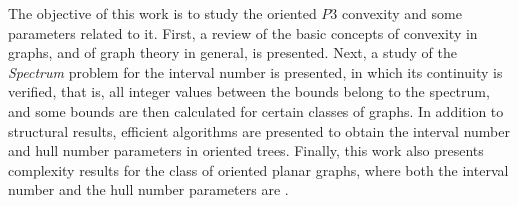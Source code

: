 The objective of this work is to study the oriented $P3$ convexity and some parameters related to it. First, a review of the basic concepts of convexity in graphs, and of graph theory in general, is presented. Next, a study of the \emph{Spectrum} problem for the interval number is presented, in which its continuity is verified, that is, all integer values between the bounds belong to the spectrum, and some bounds are then calculated for certain classes of graphs. In addition to structural results, efficient algorithms are presented to obtain the interval number and hull number parameters in oriented trees. Finally, this work also presents complexity results for the class of oriented planar graphs, where both the interval number and the hull number parameters are \npcsi.

